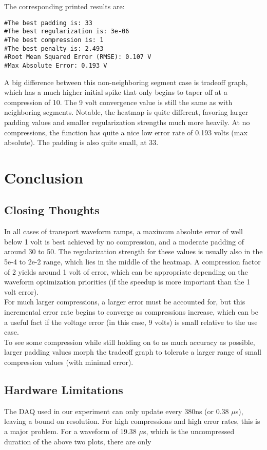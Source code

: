 \documentclass[11pt, a4paper]{article}
\theoremstyle{definition}
\numberwithin{equation}{section}
\begin{document}
The corresponding printed results are:

\begin{verbatim}
#The best padding is: 33
#The best regularization is: 3e-06
#The best compression is: 1
#The best penalty is: 2.493
#Root Mean Squared Error (RMSE): 0.107 V
#Max Absolute Error: 0.193 V
\end{verbatim}

A big difference between this non-neighboring segment case is tradeoff graph, which has a much higher initial spike that only begins to taper off at a compression of 10. The 9 volt convergence value is still the same as with neighboring segments. Notable, the heatmap is quite different, favoring larger padding values and smaller regularization strengths much more heavily. At no compressions, the function has quite a nice low error rate of 0.193 volts (max absolute). The padding is also quite small, at 33.

\section{Conclusion}
\subsection{Closing Thoughts}
In all cases of transport waveform ramps, a maximum absolute error of well below 1 volt is best achieved by no compression, and a moderate padding of around 30 to 50. The regularization strength for these values is usually also in the 5e-4 to 2e-2 range, which lies in the middle of the heatmap. A compression factor of 2 yields around 1 volt of error, which can be appropriate depending on the waveform optimization priorities (if the speedup is more important than the 1 volt error). 
\\
For much larger compressions, a larger error must be accounted for, but this incremental error rate begins to converge as compressions increase, which can be a useful fact if the voltage error (in this case, 9 volts) is small relative to the use case.
\\
To see some compression while still holding on to as much accuracy as possible, larger padding values morph the tradeoff graph to tolerate a larger range of small compression values (with minimal error).

\subsection{Hardware Limitations}
The DAQ used in our experiment can only update every 380ns (or 0.38 $\mu$s), leaving a bound on resolution. For high compressions and high error rates, this is a major problem. For a waveform of 19.38 $\mu$s, which is the uncompressed duration of the above two plots, there are only
\end{document}
